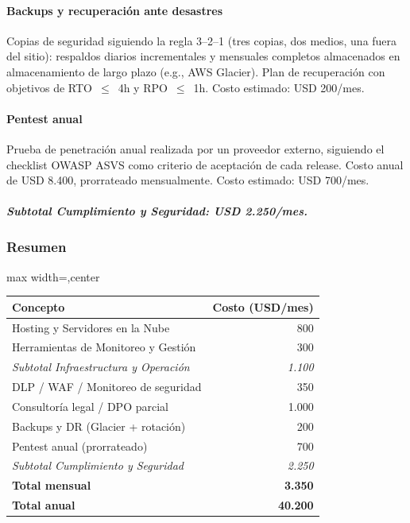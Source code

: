 \paragraph{Backups y recuperación ante desastres}
Copias de seguridad siguiendo la regla 3--2--1 (tres copias, dos medios, una fuera del sitio): respaldos diarios incrementales y mensuales completos almacenados en almacenamiento de largo plazo (e.g., AWS Glacier). Plan de recuperación con objetivos de RTO~$\leq$~4h y RPO~$\leq$~1h.
Costo estimado: USD 200/mes.

\paragraph{Pentest anual}
Prueba de penetración anual realizada por un proveedor externo, siguiendo el checklist OWASP ASVS como criterio de aceptación de cada release. Costo anual de USD 8.400, prorrateado mensualmente.
Costo estimado: USD 700/mes.

\subparagraph{Subtotal Cumplimiento y Seguridad: USD 2.250/mes.}

\subsubsection{Resumen}


\begin{center}
\footnotesize
\begin{adjustbox}{max width=\textwidth,center}
\begin{tabular}{lr}
\hline
\textbf{Concepto} & \textbf{Costo (USD/mes)} \\
\hline
Hosting y Servidores en la Nube & 800 \\
Herramientas de Monitoreo y Gestión & 300 \\
\hline
\textit{Subtotal Infraestructura y Operación} & \textit{1.100} \\
\hline
DLP / WAF / Monitoreo de seguridad & 350 \\
Consultoría legal / DPO parcial & 1.000 \\
Backups y DR (Glacier + rotación) & 200 \\
Pentest anual (prorrateado) & 700 \\
\hline
\textit{Subtotal Cumplimiento y Seguridad} & \textit{2.250} \\
\hline
\textbf{Total mensual} & \textbf{3.350} \\
\hline
\textbf{Total anual} & \textbf{40.200} \\
\hline
\end{tabular}
\end{adjustbox}
\end{center}




